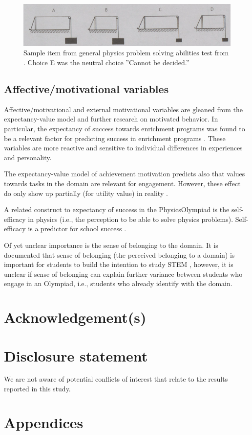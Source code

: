 \documentclass[]{interact}
\begin{document}
\begin{figure}
\centering
\includegraphics{../../img/APT.png}
\caption{Sample item from general physics problem solving abilities test from \cite{Heller.2007}. Choice E was the neutral choice ''Cannot be decided.''}
\label{APT}
\end{figure}

\subsection{Affective/motivational variables} 
Affective/motivational and external motivational variables are gleaned from the expectancy-value model and further research on motivated behavior. In particular, the expectancy of success towards enrichment programs was found to be a relevant factor for predicting success in enrichment programs \citep{Urhahne.2012}. These variables are more reactive and sensitive to individual differences in experiences and personality. 

The expectancy-value model of achievement motivation predicts also that values towards tasks in the domain are relevant for engagement. However, these effect do only show up partially (for utility value) in reality \citep{Urhahne.2012}.

A related construct to expectancy of success in the PhysicsOlympiad is the self-efficacy in physics (i.e., the perception to be able to solve physics problems). Self-efficacy is a predictor for school success \citep[e.g.,][]{Britner.2006}. 

Of yet unclear importance is the sense of belonging to the domain. It is documented that sense of belonging (the perceived belonging to a domain) is important for students to build the intention to study STEM \citep{Good.2012}, however, it is unclear if sense of belonging can explain further variance between students who engage in an Olympiad, i.e., students who already identify with the domain.





\section*{Acknowledgement(s)}


\section*{Disclosure statement}

We are not aware of potential conflicts of interest that relate to the results reported in this study.



\newpage





\newpage
\section{Appendices}

\appendix
\end{document}
